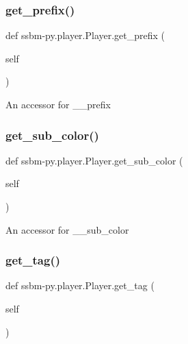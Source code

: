 \subsubsection{\texorpdfstring{get\+\_\+prefix()}{get\_prefix()}}
{\footnotesize\ttfamily def ssbm-\/py.\+player.\+Player.\+get\+\_\+prefix (\begin{DoxyParamCaption}\item[{}]{self }\end{DoxyParamCaption})}

\begin{DoxyVerb}An accessor for __prefix \end{DoxyVerb}
 \mbox{\label{classssbm-py_1_1player_1_1_player_ad0147eb4ccff73c6708a23a2f6a02be4}} 
\subsubsection{\texorpdfstring{get\+\_\+sub\+\_\+color()}{get\_sub\_color()}}
{\footnotesize\ttfamily def ssbm-\/py.\+player.\+Player.\+get\+\_\+sub\+\_\+color (\begin{DoxyParamCaption}\item[{}]{self }\end{DoxyParamCaption})}

\begin{DoxyVerb}An accessor for __sub_color \end{DoxyVerb}
 \mbox{\label{classssbm-py_1_1player_1_1_player_a249df262cf377aa1a4ad4c1a28ed4c3c}} 
\subsubsection{\texorpdfstring{get\+\_\+tag()}{get\_tag()}}
{\footnotesize\ttfamily def ssbm-\/py.\+player.\+Player.\+get\+\_\+tag (\begin{DoxyParamCaption}\item[{}]{self }\end{DoxyParamCaption})}

